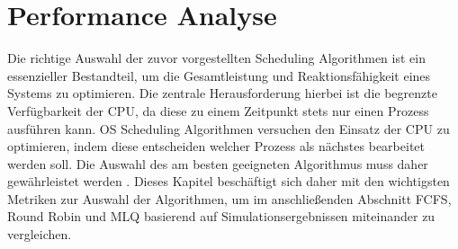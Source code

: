 \chapter{Performance Analyse}
Die richtige Auswahl der zuvor vorgestellten Scheduling Algorithmen ist ein essenzieller Bestandteil, um die Gesamtleistung und Reaktionsfähigkeit eines Systems zu optimieren. Die zentrale Herausforderung hierbei ist die begrenzte Verfügbarkeit der \ac{CPU}, da diese zu einem Zeitpunkt stets nur einen Prozess ausführen kann. \ac{OS} Scheduling Algorithmen versuchen den Einsatz der \ac{CPU} zu optimieren, indem diese entscheiden welcher Prozess als nächstes bearbeitet werden soll. Die Auswahl des am besten geeigneten Algorithmus muss daher gewährleistet werden \autocite{goel_comparative_2013}. Dieses Kapitel beschäftigt sich daher mit den wichtigsten Metriken zur Auswahl der Algorithmen, um im anschließenden Abschnitt \ac{FCFS}, Round Robin und \ac{MLQ} basierend auf Simulationsergebnissen miteinander zu vergleichen.